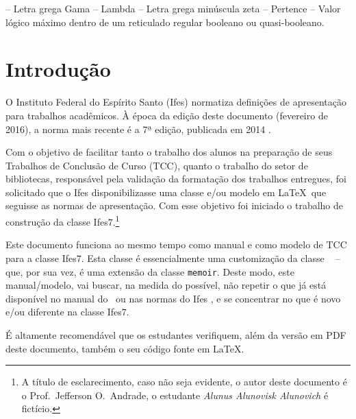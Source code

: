 \documentclass[times,english,brazil,oneside]{ifes7}
\newcommand{\ifestex}{\textsf{Ifes$7$}}
\begin{document}
\begin{simbolos}
  \simb{$\Gamma$} -- Letra grega Gama
  \simb{$\Lambda$} -- Lambda
  \simb{$\zeta$} -- Letra grega minúscula zeta
  \simb{$\in$} -- Pertence
  \simb{$\top$} -- Valor lógico máximo dentro de um reticulado regular booleano ou quasi-booleano.
\end{simbolos}
\cleardoublepage


\tableofcontents*
\cleardoublepage


\textual


\setlength{\afterchapskip}{0\baselineskip}


\chapter{Introdução}
\label{cha:introducao}

O Instituto Federal do Espírito Santo (Ifes) normatiza definições de
apresentação para trabalhos acadêmicos. À época da edição deste
documento (fevereiro de 2016), a norma mais recente é a 7ª edição,
publicada em 2014 \cite{Ifes2014}.

Com o objetivo de facilitar tanto o trabalho dos alunos na preparação
de seus Trabalhos de Conclusão de Curso (TCC), quanto o trabalho do
setor de bibliotecas, responsável pela validação da formatação dos
trabalhos entregues, foi solicitado que o Ifes disponibilizasse uma
classe e/ou modelo em \LaTeX\ que seguisse as normas de
apresentação. Com esse objetivo foi iniciado o trabalho de construção
da classe \ifestex.\footnote{A título de esclarecimento, caso não seja
  evidente, o autor deste documento é o Prof.\ Jefferson O.\ Andrade,
  o estudante \emph{Alunus Alunovisk Alunovich} é fictício.}

Este documento funciona ao mesmo tempo como manual e como modelo de
TCC para a classe \ifestex. Esta classe é essencialmente uma
customização da classe \abnTeX\ \cite{abntex2classe} -- que, por sua
vez, é uma extensão da classe \texttt{memoir}. Deste modo, este
manual/modelo, vai buscar, na medida do possível, não repetir o que já
está disponível no manual do \abnTeX\ ou nas normas do Ifes
\cite{Ifes2014}, e se concentrar no que é novo e/ou diferente na
classe \ifestex.

É altamente recomendável que os estudantes verifiquem, além da versão
em PDF deste documento, também o seu código fonte em \LaTeX.
\end{document}
